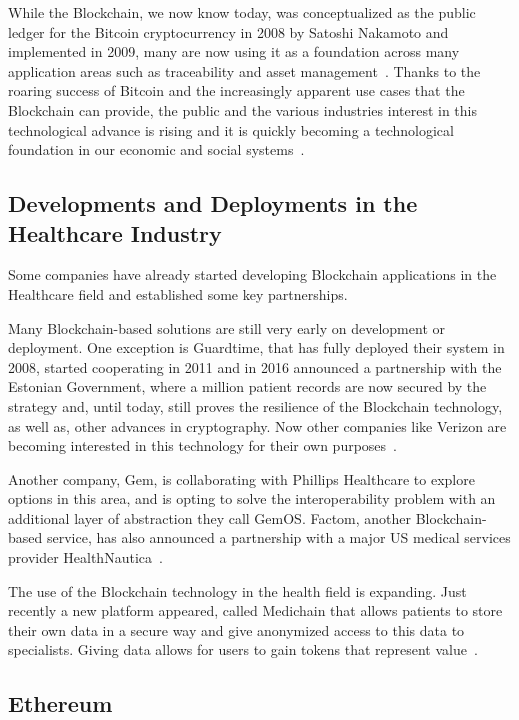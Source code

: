 While the Blockchain, we now know today, was conceptualized as the public
ledger for the Bitcoin cryptocurrency in 2008 by Satoshi Nakamoto and
implemented in 2009, many are now using it as a foundation across many
application areas such as traceability and asset management~\cite{MIT2016}.
Thanks to the roaring success of Bitcoin and the increasingly apparent use
cases that the Blockchain can provide, the public and the various industries
interest in this technological advance is rising and it is quickly becoming a
technological foundation in our economic and social systems~\cite{Zago2018,
Marr2018,Long2018}.

\subsection{Developments and Deployments in the Healthcare Industry}\label{blockchainHealthcare}

Some companies have already started developing Blockchain applications in the
Healthcare field and established some key partnerships.

Many Blockchain-based solutions are still very early on development or
deployment.  One exception is Guardtime, that has fully deployed their system
in 2008, started cooperating in 2011 and in 2016 announced a partnership with
the Estonian Government, where a million patient records are now secured by the
strategy and, until today, still proves the resilience of the Blockchain
technology, as well as, other advances in cryptography.  Now other companies
like Verizon are becoming interested in this technology for their own
purposes~\cite{GuardTime2018,EstonianGovernmentGuardTime2016}.

Another company, Gem, is collaborating with Phillips Healthcare to explore
options in this area, and is opting to solve the interoperability problem with
an additional layer of abstraction they call GemOS.  Factom, another
Blockchain-based service, has also announced a partnership with a major US
medical services provider
HealthNautica~\cite{BlockchainCompHealth2017,FactomPartnership2017}.

The use of the Blockchain technology in the health field is expanding. Just
recently a new platform appeared, called Medichain that allows patients to
store their own data in a secure way and give anonymized access to this data to
specialists. Giving data allows for users to gain tokens that represent
value~\cite{MediChain2018}.

\subsection{Ethereum}

